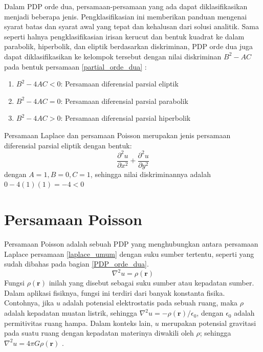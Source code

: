 Dalam PDP orde dua, persamaan-persamaan yang ada dapat diklasifikasikan menjadi beberapa jenis. Pengklasifikasian ini memberikan panduan mengenai syarat batas dan syarat awal yang tepat dan kehalusan dari solusi analitik. Sama seperti halnya pengklasifikasian irisan kerucut dan bentuk kuadrat ke dalam parabolik, hiperbolik, dan eliptik berdasarkan diskriminan, PDP orde dua juga dapat diklasifikasikan ke kelompok tersebut dengan nilai diskriminan $B^2 - AC$ pada bentuk persamaan \eqref{partial_orde_dua} \citep{yehudapinchover_2013_an}:
\begin{enumerate}
    \item $B^2 - 4AC < 0$: Persamaan diferensial parsial eliptik
    \item $B^2 - 4AC = 0$: Persamaan diferensial parsial parabolik
    \item $B^2 - 4AC > 0$: Persamaan diferensial parsial hiperbolik
\end{enumerate}

Persamaan Laplace dan persamaan Poisson merupakan jenis persamaan diferensial parsial eliptik dengan bentuk:
\begin{equation}\label{pdp_eliptik}
    \frac{\partial^2u}{\partial x^2} + \frac{\partial^2u}{\partial y^2}
\end{equation}
dengan $A = 1, B = 0, C = 1$, sehingga nilai diskriminannya adalah $0-4(1)(1) = -4 <0$

\section{Persamaan Poisson}
Persamaan Poisson adalah sebuah PDP yang menghubungkan antara persamaan Laplace persamaan \eqref{laplace_umum} dengan suku sumber tertentu, seperti yang sudah dibahas pada bagian \ref{PDP_orde_dua}.
\begin{equation}
    \nabla^2 u = \rho(\textbf{r})
\end{equation}
Fungsi $\rho(\textbf{r})$ inilah yang disebut sebagai suku sumber atau kepadatan sumber. Dalam aplikasi fisiknya, fungsi ini terdiri dari banyak konstanta fisika. Contohnya, jika $u$ adalah potensial elektrostatis pada sebuah ruang, maka $\rho$ adalah kepadatan muatan listrik, sehingga $\nabla^2 u = -\rho(\textbf{r})/\epsilon_{0}$, dengan $\epsilon_0$ adalah permitivitas ruang hampa. Dalam konteks lain, $u$ merupakan potensial gravitasi pada suatu ruang dengan kepadatan materinya diwakili oleh $\rho$; sehingga $\nabla^2 u = 4\pi G \rho (\textbf{r})$ \citep{riley_2006_mathematical}.

